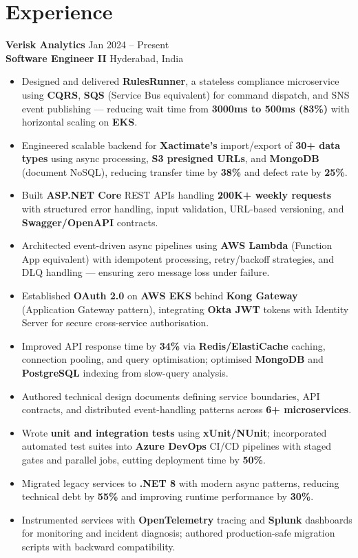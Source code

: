 \documentclass[letterpaper,10pt]{article}
\begin{document}
\section*{Experience}

\textbf{Verisk Analytics} \hfill Jan 2024 -- Present \\
\textbf{Software Engineer II} \hfill Hyderabad, India

\begin{itemize}[leftmargin=*]
    \item Designed and delivered \textbf{RulesRunner}, a stateless compliance microservice using \textbf{CQRS}, \textbf{SQS} (Service Bus equivalent) for command dispatch, and SNS event publishing — reducing wait time from \textbf{3000ms to 500ms (83\%)} with horizontal scaling on \textbf{EKS}.
    \item Engineered scalable backend for \textbf{Xactimate's} import/export of \textbf{30+ data types} using async processing, \textbf{S3 presigned URLs}, and \textbf{MongoDB} (document NoSQL), reducing transfer time by \textbf{38\%} and defect rate by \textbf{25\%}.
    \item Built \textbf{ASP.NET Core} REST APIs handling \textbf{200K+ weekly requests} with structured error handling, input validation, URL-based versioning, and \textbf{Swagger/OpenAPI} contracts.
    \item Architected event-driven async pipelines using \textbf{AWS Lambda} (Function App equivalent) with idempotent processing, retry/backoff strategies, and DLQ handling — ensuring zero message loss under failure.
    \item Established \textbf{OAuth 2.0} on \textbf{AWS EKS} behind \textbf{Kong Gateway} (Application Gateway pattern), integrating \textbf{Okta JWT} tokens with Identity Server for secure cross-service authorisation.
    \item Improved API response time by \textbf{34\%} via \textbf{Redis/ElastiCache} caching, connection pooling, and query optimisation; optimised \textbf{MongoDB} and \textbf{PostgreSQL} indexing from slow-query analysis.
    \item Authored technical design documents defining service boundaries, API contracts, and distributed event-handling patterns across \textbf{6+ microservices}.
    \item Wrote \textbf{unit and integration tests} using \textbf{xUnit/NUnit}; incorporated automated test suites into \textbf{Azure DevOps} CI/CD pipelines with staged gates and parallel jobs, cutting deployment time by \textbf{50\%}.
    \item Migrated legacy services to \textbf{.NET 8} with modern async patterns, reducing technical debt by \textbf{55\%} and improving runtime performance by \textbf{30\%}.
    \item Instrumented services with \textbf{OpenTelemetry} tracing and \textbf{Splunk} dashboards for monitoring and incident diagnosis; authored production-safe migration scripts with backward compatibility.
\end{itemize}
\end{document}
